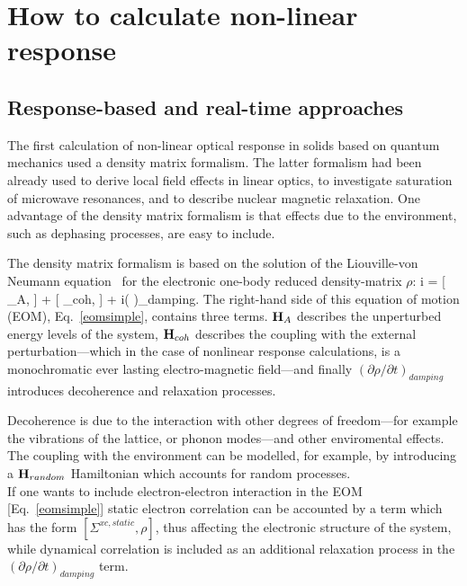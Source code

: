 \section{How to calculate non-linear response}
\subsection{Response-based and real-time approaches}
The first calculation of non-linear optical response in solids based on quantum mechanics used a density matrix formalism.\cite{bloembergen1964quantum} The latter formalism had been already used to derive local field effects in linear optics\cite{PhysRev.126.413,wiser1963dielectric}, to investigate  saturation of microwave resonances\cite{karplus1948note}, and to describe nuclear magnetic relaxation\cite{kubo1954general,RevModPhys.33.249,PhysRev.102.104}. One advantage of the density matrix formalism is that effects due to the environment, such as dephasing processes, are easy to include.\cite{manzano2020short}

The density matrix formalism is based on the solution of the Liouville-von Neumann equation~\cite{neumann} for the electronic one-body reduced density-matrix $\rho$:
\be
i \hbar {} = [ \HH_A, \rho] + [ \HH_{coh}, \rho] + i\hbar \left (  \right )_{damping}.
\label{eomsimple}
\ee
The right-hand side of this equation of motion (EOM), Eq.~\ref{eomsimple}, contains three terms. ${\bf H}_A$ describes the unperturbed energy levels of the system, ${\bf H}_{coh}$ describes the coupling with the external perturbation---which in the case of nonlinear response calculations, is a monochromatic ever lasting electro-magnetic field---and finally $\left ( \partial \rho/\partial t \right )_{damping}$ introduces decoherence and relaxation processes.

Decoherence is due to the interaction with other degrees of freedom---for example the vibrations of the lattice, or phonon modes---and other enviromental effects. The coupling with the environment can be modelled, for example, by introducing a ${\bf H}_{random}$ Hamiltonian which accounts for random processes.\cite{manzano2020short}\\
If one wants to include electron-electron interaction  in the EOM [Eq.~\ref{eomsimple}] static electron correlation can be accounted by a term which has the form $[\Sigma^{xc,static},\rho]$, thus affecting the electronic structure of the system, while dynamical correlation is included as an additional relaxation process in the $\left ( \partial \rho/\partial t \right )_{damping}$ term.


